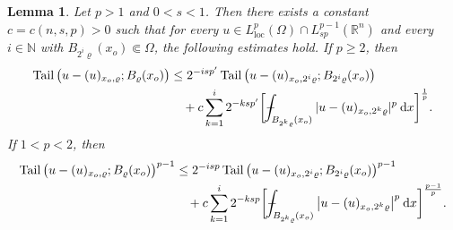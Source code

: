 \documentclass[10pt,letterpaper]{amsart}
\newtheorem{lemma}[theorem]{Lemma}
\theoremstyle{definition}
\numberwithin{theorem}{section}
\numberwithin{equation}{section}
\newcommand{\1}{\ensuremath{\mathds{1}}}
\def\Xint#1{\mathchoice
    {\XXint\displaystyle\textstyle{#1}}%
    {\XXint\textstyle\scriptstyle{#1}}%
    {\XXint\scriptstyle\scriptscriptstyle{#1}}%
    {\XXint\scriptscriptstyle\scriptscriptstyle{#1}}%
    \!\int}
\def\XXint#1#2#3{\setbox0=\hbox{$#1{#2#3}{\int}$}
    \vcenter{\hbox{$#2#3$}}\kern-0.5\wd0}
\def\bint{\Xint-}
\renewcommand{\rho}{\varrho}
\renewcommand{\rho}{\varrho}
\renewcommand{\d}{\:\! \mathrm{d}}
\DeclareMathOperator{\Tail}{Tail}
\numberwithin{equation}{section}
\begin{document}
\begin{lemma}\label{lem:tail-est}
Let $p>1$ and $0<s<1$. 
Then there exists a constant $c=c(n,s,p)>0$ such that for every 
$u\in L^{p}_{\mathrm{loc}}(\Omega)\cap L^{p-1}_{sp}(\mathbb{R}^n)$ 
and every $i\in\mathbb{N}$ with $B_{2^i\rho}(x_o)\Subset\Omega$, the following estimates hold. 
If $p\ge2$, then
\begin{align*}
    \Tail \big(u-(u)_{x_o,\rho}; B_\rho(x_o)\big)
    &\le
    2^{-isp'}
    \Tail \big(u-(u)_{x_o,2^i\rho}; B_{2^i\rho}(x_o)\big) \\
    &\quad +
    c \sum_{k=1}^{i} 2^{-ksp'}
    \bigg[
        \bint_{B_{2^k\rho}(x_o)}
        |u-(u)_{x_o,2^k\rho}|^p\, \d x
    \bigg]^\frac1p .
\end{align*} 
If $1<p<2$, then
\begin{align*}
    \Tail \big(u-(u)_{x_o,\rho}; B_\rho(x_o)\big)^{p-1} 
    &\le
    2^{-isp}
    \Tail \big(u-(u)_{x_o,2^i\rho}; B_{2^i\rho}(x_o)\big)^{p-1} \\
    &\phantom{\le\,} +
    c \sum_{k=1}^{i} 2^{-ksp} \bigg[ \bint_{B_{2^k\rho}(x_o)} \big|u-(u)_{x_o,2^k\rho}\big|^{p} \, \d x \bigg]^\frac{p-1}{p} .
\end{align*}
\end{lemma}
\end{document}

